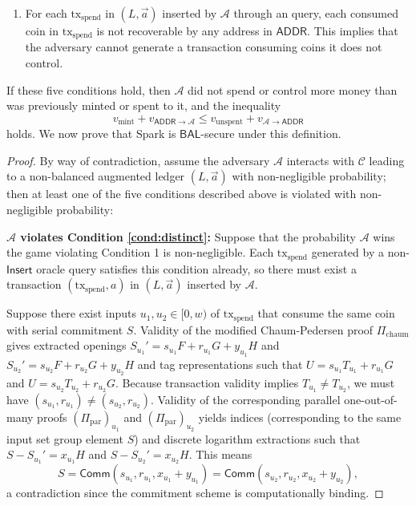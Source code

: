 \documentclass{llncs}
\newcommand{\func}[1]{\mathsf{#1}}
\newcommand{\comm}{\func{Comm}}
\begin{document}
\begin{enumerate}
    \item\label{cond:honest} For each $\text{tx}_{\text{spend}}$ in $(L, \vec{a})$ inserted by $\mathcal{A}$ through an  query, each consumed coin in $\text{tx}_{\text{spend}}$ is not recoverable by any address in $\func{ADDR}$.
    This implies that the adversary cannot generate a transaction consuming coins it does not control.
\end{enumerate}
If these five conditions hold, then $\mathcal{A}$ did not spend or control more money than was previously minted or spent to it, and the inequality
$$v_{\text{mint}} + v_{\func{ADDR} \to \mathcal{A}} \leq v_{\text{unspent}} + v_{\mathcal{A} \to \func{ADDR}}$$
holds.
We now prove that Spark is $\func{BAL}$-secure under this definition.

\begin{proof}
By way of contradiction, assume the adversary $\mathcal{A}$ interacts with $\mathcal{C}$ leading to a non-balanced augmented ledger $(L, \vec{a})$ with non-negligible probability; then at least one of the five conditions described above is violated with non-negligible probability:

\textbf{$\mathcal{A}$ violates Condition \ref{cond:distinct}:} Suppose that the probability $\mathcal{A}$ wins the game violating Condition 1 is non-negligible.
Each $\text{tx}_{\text{spend}}$ generated by a non-$\func{Insert}$ oracle query satisfies this condition already, so there must exist a transaction $(\text{tx}_{\text{spend}}, a)$ in $(L, \vec{a})$ inserted by $\mathcal{A}$.

Suppose there exist inputs $u_1,u_2 \in [0,w)$ of $\text{tx}_{\text{spend}}$ that consume the same coin with serial commitment $S$.
Validity of the modified Chaum-Pedersen proof $\Pi_{\text{chaum}}$ gives extracted openings $S_{u_1}' = s_{u_1} F + r_{u_1} G + y_{u_1} H$ and $S_{u_2}' = s_{u_2} F + r_{u_2} G + y_{u_2} H$ and tag representations such that $U = s_{u_1} T_{u_1} + r_{u_1} G$ and $U = s_{u_2} T_{u_2} + r_{u_2} G$.
Because transaction validity implies $T_{u_1} \neq T_{u_2}$, we must have $(s_{u_1},r_{u_1}) \neq (s_{u_2},r_{u_2})$.
Validity of the corresponding parallel one-out-of-many proofs $(\Pi_{\text{par}})_{u_1}$ and $(\Pi_{\text{par}})_{u_2}$ yields indices (corresponding to the same input set group element $S$) and discrete logarithm extractions such that $S - S_{u_1}' = x_{u_1} H$ and $S - S_{u_2}' = x_{u_2} H$.
This means
$$S = \comm(s_{u_1},r_{u_1},x_{u_1}+y_{u_1}) = \comm(s_{u_2},r_{u_2},x_{u_2}+y_{u_2}),$$
a contradiction since the commitment scheme is computationally binding.


\end{proof}
\end{document}
